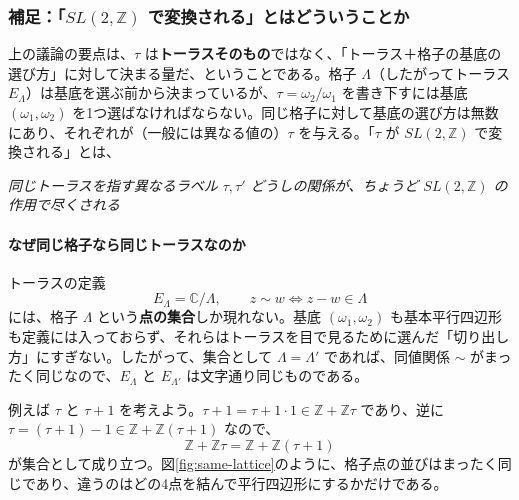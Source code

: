 \documentclass[uplatex, dvipdfmx, book]{jsbook}
\let\origsubsubsection\subsubsection
\renewcommand{\subsection}{\origsubsubsection}
\renewcommand{\subsubsection}{\paragraph}
\begin{document}
\subsection{補足：「$SL(2,\mathbb{Z})$ で変換される」とはどういうことか}
\label{sec:modular-supplement}

上の議論の要点は、$\tau$ は\textbf{トーラスそのもの}ではなく、「トーラス＋格子の基底の選び方」に対して決まる量だ、ということである。格子 $\Lambda$（したがってトーラス $E_\Lambda$）は基底を選ぶ前から決まっているが、$\tau = \omega_2/\omega_1$ を書き下すには基底 $(\omega_1, \omega_2)$ を1つ選ばなければならない。同じ格子に対して基底の選び方は無数にあり、それぞれが（一般には異なる値の）$\tau$ を与える。「$\tau$ が $SL(2,\mathbb{Z})$ で変換される」とは、
\begin{center}
    \emph{同じトーラスを指す異なるラベル $\tau, \tau'$ どうしの関係が、ちょうど $SL(2,\mathbb{Z})$ の作用で尽くされる}
\end{center}

\paragraph{なぜ同じ格子なら同じトーラスなのか}
トーラスの定義
\begin{equation*}
    E_\Lambda = \mathbb{C}/\Lambda, \qquad z \sim w \iff z - w \in \Lambda
\end{equation*}
には、格子 $\Lambda$ という\textbf{点の集合}しか現れない。基底 $(\omega_1, \omega_2)$ も基本平行四辺形も定義には入っておらず、それらはトーラスを目で見るために選んだ「切り出し方」にすぎない。したがって、集合として $\Lambda = \Lambda'$ であれば、同値関係 $\sim$ がまったく同じなので、$E_\Lambda$ と $E_{\Lambda'}$ は文字通り同じものである。

例えば $\tau$ と $\tau + 1$ を考えよう。$\tau + 1 = \tau + 1 \cdot 1 \in \mathbb{Z} + \mathbb{Z}\tau$ であり、逆に $\tau = (\tau + 1) - 1 \in \mathbb{Z} + \mathbb{Z}(\tau+1)$ なので、
\begin{equation*}
    \mathbb{Z} + \mathbb{Z}\tau = \mathbb{Z} + \mathbb{Z}(\tau + 1)
\end{equation*}
が集合として成り立つ。図\ref{fig:same-lattice}のように、格子点の並びはまったく同じであり、違うのはどの4点を結んで平行四辺形にするかだけである。
\end{document}
